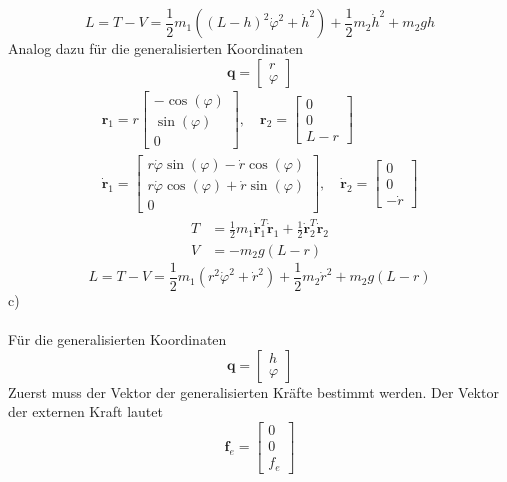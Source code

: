 \[
	L = T - V = \frac{1}{2}m_1\left((L - h)^2\dot{\varphi}^2 + \dot{h}^2\right) + \frac{1}{2}m_2\dot{h}^2 + m_2gh
\]
\newpage
\noindent
Analog dazu für die generalisierten Koordinaten
\[
	\textbf{q} = \begin{bmatrix}
		r \\
		\varphi
	\end{bmatrix}
\]
\begin{align*}
	\textbf{r}_1 = r\begin{bmatrix}
		-\cos(\varphi) \\
		\sin(\varphi) \\
		0
	\end{bmatrix}
	, \quad
	\textbf{r}_2 = \begin{bmatrix}
		0 \\
		0 \\
		L - r
	\end{bmatrix}
	\\
	\dot{\textbf{r}}_1 = \begin{bmatrix}
		r\dot{\varphi}\sin(\varphi) - \dot{r}\cos(\varphi) \\
		r\dot{\varphi}\cos(\varphi) + \dot{r}\sin(\varphi) \\
		0
	\end{bmatrix}
	, \quad
	\dot{\textbf{r}}_2 = \begin{bmatrix}
		0 \\
		0 \\
		-\dot{r}
	\end{bmatrix}
\end{align*}
\begin{align*}
	T &= \frac{1}{2}m_1\dot{\textbf{r}}_1^T\dot{\textbf{r}}_1 + \frac{1}{2}\dot{\textbf{r}}_2^T\dot{\textbf{r}}_2 \\
	V &= -m_2g(L - r)
\end{align*}
\[
	L = T - V = \frac{1}{2}m_1\left(r^2\dot{\varphi}^2 + \dot{r}^2\right) + \frac{1}{2}m_2\dot{r}^2 + m_2g(L - r)
\]
c)\\ \\
Für die generalisierten Koordinaten
\[
	\textbf{q} = \begin{bmatrix}
	h \\
	\varphi
	\end{bmatrix}
\]
Zuerst muss der Vektor der generalisierten Kräfte bestimmt werden. Der Vektor der externen Kraft lautet
\[
	\textbf{f}_e = \begin{bmatrix}
		0 \\
		0 \\
		f_e
	\end{bmatrix}
\]
